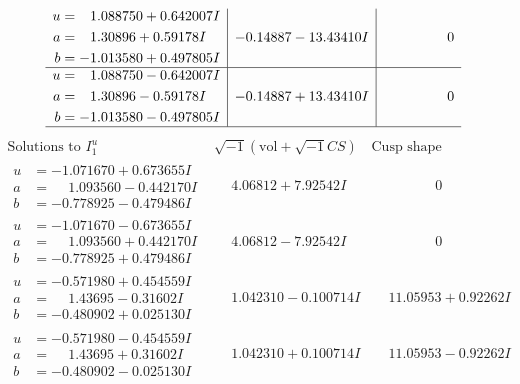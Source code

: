 \documentclass[1p]{elsarticle_modified}
\theoremstyle{definition}
\newcommand{\I}{\sqrt{-1}}
\begin{document}
$$\begin{array}{c|c|c}
\begin{aligned}
u &= \phantom{-}1.088750 + 0.642007 I \\
a &= \phantom{-}1.30896 + 0.59178 I \\
b &= -1.013580 + 0.497805 I\end{aligned}
 & -0.14887 - 13.43410 I & \phantom{-0.000000 } 0 \\ \hline\begin{aligned}
u &= \phantom{-}1.088750 - 0.642007 I \\
a &= \phantom{-}1.30896 - 0.59178 I \\
b &= -1.013580 - 0.497805 I\end{aligned}
 & -0.14887 + 13.43410 I & \phantom{-0.000000 } 0\\
 \hline 
 \end{array}$$\newpage$$\begin{array}{c|c|c}  
\text{Solutions to }I^u_{1}& \I (\text{vol} + \sqrt{-1}CS) & \text{Cusp shape}\\
 \hline 
\begin{aligned}
u &= -1.071670 + 0.673655 I \\
a &= \phantom{-}1.093560 - 0.442170 I \\
b &= -0.778925 - 0.479486 I\end{aligned}
 & \phantom{-}4.06812 + 7.92542 I & \phantom{-0.000000 } 0 \\ \hline\begin{aligned}
u &= -1.071670 - 0.673655 I \\
a &= \phantom{-}1.093560 + 0.442170 I \\
b &= -0.778925 + 0.479486 I\end{aligned}
 & \phantom{-}4.06812 - 7.92542 I & \phantom{-0.000000 } 0 \\ \hline\begin{aligned}
u &= -0.571980 + 0.454559 I \\
a &= \phantom{-}1.43695 - 0.31602 I \\
b &= -0.480902 + 0.025130 I\end{aligned}
 & \phantom{-}1.042310 - 0.100714 I & \phantom{-}11.05953 + 0.92262 I \\ \hline\begin{aligned}
u &= -0.571980 - 0.454559 I \\
a &= \phantom{-}1.43695 + 0.31602 I \\
b &= -0.480902 - 0.025130 I\end{aligned}
 & \phantom{-}1.042310 + 0.100714 I & \phantom{-}11.05953 - 0.92262 I \\ \hline\begin{aligned}

\end{aligned}
\end{array}$$
\end{document}
